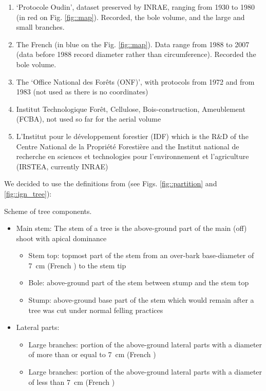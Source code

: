 \begin{enumerate}
	\item `Protocole Oudin', dataset preserved by INRAE, ranging from 1930 to 1980 (in red on Fig. \ref{fig::map}). Recorded, the bole volume, and the large and small branches.
	\item The French \NFI (in blue on the Fig. \ref{fig::map}). Data range from 1988 to 2007 (data before 1988 record diameter rather than circumference). Recorded the bole volume.
	\item The `Office National des Forêts (ONF)', with protocols from 1972 and from 1983 (not used as there is no coordinates)
	\item Institut Technologique Forêt, Cellulose, Bois-construction, Ameublement (FCBA), not used so far for the aerial volume
	\item L'Institut pour le développement forestier (IDF) which is the R\&D of the Centre National de la Propriété Forestière and the Institut national de recherche en sciences et technologies pour l'environnement et l'agriculture (IRSTEA, currently INRAE)
\end{enumerate}

We decided to use the definitions from \cite{Gschwantner2009} (see Figs. \ref{fig::partition} and \ref{fig::ign_tree}):

\begin{marginfigure}%
	
	\caption{Scheme of tree components.\label{fig::ign_tree}}
\end{marginfigure}

\begin{itemize}
	\item Main stem: The stem of a tree is the above-ground part of the main (off) shoot with apical dominance
	\begin{itemize}
		\item Stem top: topmost part of the stem from an over-bark base-diameter of \qty{7}{\centi\metre} (French \NFI) to the stem tip
		\item Bole: above-ground part of the stem between stump and the stem top
		\item Stump: above-ground base part of the stem which would remain after a tree was cut under normal felling practices
	\end{itemize}
	\item Lateral parts:
	\begin{itemize}
		\item Large branches: portion of the above-ground lateral parts with a diameter of more than or equal to \qty{7}{\centi\metre} (French \NFI)
		\item Large branches: portion of the above-ground lateral parts with a diameter of less than \qty{7}{\centi\metre} (French \NFI)
	\end{itemize}
\end{itemize}
